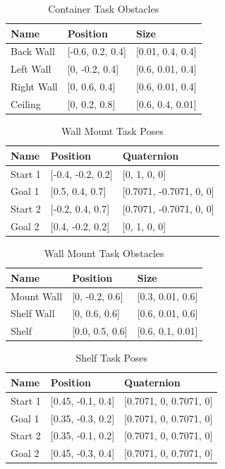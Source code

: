 \documentclass[defaultstyle,11pt]{thesis}
\begin{document}
\begin{table}[H]
    \centering
    \caption{Container Task Obstacles}
    \label{tab:containerObstacles}
    \begin{tabular}{lll}
    \hline
    \textbf{Name} & \textbf{Position} & \textbf{Size} \\
    \hline
    Back Wall & [-0.6, 0.2, 0.4] & [0.01, 0.4, 0.4] \\
    Left Wall & [0, -0.2, 0.4] & [0.6, 0.01, 0.4] \\
    Right Wall & [0, 0.6, 0.4] & [0.6, 0.01, 0.4] \\
    Ceiling & [0, 0.2, 0.8] & [0.6, 0.4, 0.01] \\
    \hline
    \end{tabular}
\end{table}

\begin{table}[H]
    \centering
    \caption{Wall Mount Task Poses}
    \label{tab:wallMountPoses}
    \begin{tabular}{lll}
    \hline
    \textbf{Name} & \textbf{Position} & \textbf{Quaternion} \\
    \hline
    Start 1 & [-0.4, -0.2, 0.2] & [0, 1, 0, 0] \\
    Goal 1 & [0.5, 0.4, 0.7] & [0.7071, -0.7071, 0, 0] \\
    Start 2 & [-0.2, 0.4, 0.7] & [0.7071, -0.7071, 0, 0] \\
    Goal 2 & [0.4, -0.2, 0.2] & [0, 1, 0, 0] \\
    \hline
    \end{tabular}
\end{table}

\begin{table}[H]
    \centering
    \caption{Wall Mount Task Obstacles}
    \label{tab:wallMountObstacles}
    \begin{tabular}{lll}
    \hline
    \textbf{Name} & \textbf{Position} & \textbf{Size} \\
    \hline
    Mount Wall & [0, -0.2, 0.6] & [0.3, 0.01, 0.6] \\
    Shelf Wall & [0, 0.6, 0.6] & [0.6, 0.01, 0.6] \\
    Shelf & [0.0, 0.5, 0.6] & [0.6, 0.1, 0.01] \\
    \hline
    \end{tabular}
\end{table}

\begin{table}[H]
    \centering
    \caption{Shelf Task Poses}
    \label{tab:simpleShelfPoses}
    \begin{tabular}{lll}
    \hline
    \textbf{Name} & \textbf{Position} & \textbf{Quaternion} \\
    \hline
    Start 1 & [0.45, -0.1, 0.4] & [0.7071, 0, 0.7071, 0] \\
    Goal 1 & [0.35, -0.3, 0.2] & [0.7071, 0, 0.7071, 0] \\
    Start 2 & [0.35, -0.1, 0.2] & [0.7071, 0, 0.7071, 0] \\
    Goal 2 & [0.45, -0.3, 0.4] & [0.7071, 0, 0.7071, 0] \\
    \hline
    \end{tabular}
\end{table}
\end{document}
